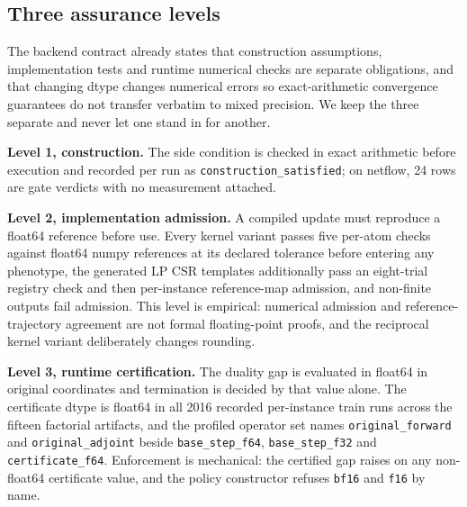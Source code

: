 \subsection{Three assurance levels}
\label{sec:mixing}

The backend contract already states that construction assumptions,
implementation tests and runtime numerical checks are separate obligations, and
that changing dtype changes numerical errors so exact-arithmetic convergence
guarantees do not transfer verbatim to mixed precision. We keep the three
separate and never let one stand in for another.

\textbf{Level 1, construction.} The side condition is checked in exact
arithmetic before execution and recorded per run as
\texttt{construction\_satisfied}; on netflow, 24 rows are gate verdicts with no
measurement attached.

\textbf{Level 2, implementation admission.} A compiled update must reproduce a
float64 reference before use. Every kernel variant passes five per-atom checks
against float64 numpy references at its declared tolerance before entering any
phenotype, the generated LP CSR templates additionally pass an eight-trial
registry check and then per-instance reference-map admission, and non-finite
outputs fail admission. This level is empirical: numerical admission and
reference-trajectory agreement are not formal floating-point proofs, and the
reciprocal kernel variant deliberately changes rounding.

\textbf{Level 3, runtime certification.} The duality gap is evaluated in
float64 in original coordinates and termination is decided by that value alone.
The certificate dtype is float64 in all 2016 recorded per-instance train runs
across the fifteen factorial artifacts, and the profiled operator set names
\texttt{original\_forward} and \texttt{original\_adjoint} beside
\texttt{base\_step\_f64}, \texttt{base\_step\_f32} and \texttt{certificate\_f64}.
Enforcement is mechanical: the certified gap raises on any non-float64
certificate value, and the policy constructor refuses \texttt{bf16} and
\texttt{f16} by name.

